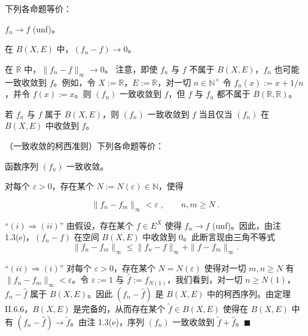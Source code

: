 \begin{examplenote}
\begin{items}
\item

下列各命题等价：

\begin{subitems}
\item

$ f_n \to f $ (unf)。

\item

在 $ B(X, E) $ 中，$ (f_n - f) \to 0 $。

\item

在 $ \mathbb{R} $ 中，$ \|f_n - f\|_\infty \to 0 $。
注意，即使 $ f_n $ 与 $ f $ 不属于 $ B(X, E) $，$ f_n $ 也可能一致收敛到 $ f $。例如，令 $ X := \mathbb{R} $，$ E := \mathbb{R} $，对一切 $ n \in \mathbb{N}^\times $ 令 $ f_n(x) := x + 1/n $，并令 $ f(x) := x $。则 $ (f_n) $ 一致收敛到 $ f $，但 $ f $ 与 $ f_n $ 都不属于 $ B(\mathbb{R}, \mathbb{R}) $。

\end{subitems}

\item

若 $f_n$ 与 $f$ 属于 $B(X,E)$，则 $(f_n)$ 一致收敛到 $f$ 当且仅当 $(f_n)$ 在 $B(X,E)$ 中收敛到 $f$。

\end{items}

\end{examplenote}

\begin{proposition}

（一致收敛的柯西准则）下列各命题等价：

\begin{subitems}
\item

函数序列 $ (f_{n}) $ 一致收敛。

\item

对每个 $ \varepsilon > 0 $，存在某个 $ N := N(\varepsilon) \in \mathbb{N} $，使得

\[
\|f_{n}-f_{m}\|_{\infty}<\varepsilon\;,\qquad n,m\geq N\;.
\]

\proofhead
“$(i) \Rightarrow (ii)$” 由假设，存在某个 $ f \in E^X $ 使得 $ f_n \to f $ (unf)。因此，由注 1.3(e)，$ (f_n - f) $ 在空间 $ B(X, E) $ 中收敛到 0。此断言现由三角不等式
\[
\|f_{n}-f_{m}\|_{\infty}\leq\|f_{n}-f\|_{\infty}+\|f-f_{m}\|_{\infty}.
\]

“$(ii) \Rightarrow (i)$” 对每个 $ \varepsilon > 0 $，存在某个 $ N = N(\varepsilon) $ 使得对一切 $ m, n \geq N $ 有 $ \|f_n - f_m\|_\infty < \varepsilon $。令 $ \varepsilon := 1 $ 与 $ \widehat{f} := f_{N(1)} $，我们看到，对一切 $ n \geq N(1) $，$ f_n - \widehat{f} $ 属于 $ B(X, E) $。因此 $ (f_n - \widehat{f}) $ 是 $ B(X, E) $ 中的柯西序列。由定理 II.6.6，$ B(X, E) $ 是完备的，从而存在某个 $ \widetilde{f} \in B(X, E) $ 使得在 $ B(X, E) $ 中有 $ (f_n - \widehat{f}) \to \widetilde{f} $。由注 1.3(e)，序列 $ (f_n) $ 一致收敛到 $ \widetilde{f} + \widehat{f} $。$ \blacksquare $

\end{subitems}

\end{proposition}

